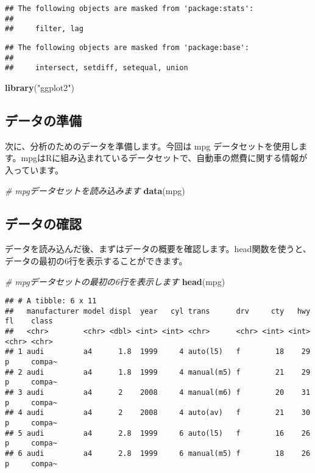 \documentclass[
]{article}
\newenvironment{Shaded}{\begin{snugshade}}{\end{snugshade}}
\newcommand{\CommentTok}[1]{\textcolor[rgb]{0.56,0.35,0.01}{\textit{#1}}}
\newcommand{\FunctionTok}[1]{\textcolor[rgb]{0.13,0.29,0.53}{\textbf{#1}}}
\newcommand{\NormalTok}[1]{#1}
\newcommand{\StringTok}[1]{\textcolor[rgb]{0.31,0.60,0.02}{#1}}
\begin{document}
\begin{verbatim}
## The following objects are masked from 'package:stats':
## 
##     filter, lag
\end{verbatim}

\begin{verbatim}
## The following objects are masked from 'package:base':
## 
##     intersect, setdiff, setequal, union
\end{verbatim}

\begin{Shaded}
\begin{Highlighting}[]
\FunctionTok{library}\NormalTok{(}\StringTok{"ggplot2"}\NormalTok{)}
\end{Highlighting}
\end{Shaded}

\hypertarget{ux30c7ux30fcux30bfux306eux6e96ux5099}{%
\subsection{データの準備}\label{ux30c7ux30fcux30bfux306eux6e96ux5099}}

次に、分析のためのデータを準備します。今回は mpg
データセットを使用します。mpgはRに組み込まれているデータセットで、自動車の燃費に関する情報が入っています。

\begin{Shaded}
\begin{Highlighting}[]
\CommentTok{\# mpgデータセットを読み込みます}
\FunctionTok{data}\NormalTok{(mpg)}
\end{Highlighting}
\end{Shaded}

\hypertarget{ux30c7ux30fcux30bfux306eux78baux8a8d}{%
\subsection{データの確認}\label{ux30c7ux30fcux30bfux306eux78baux8a8d}}

データを読み込んだ後、まずはデータの概要を確認します。head関数を使うと、データの最初の6行を表示することができます。

\begin{Shaded}
\begin{Highlighting}[]
\CommentTok{\# mpgデータセットの最初の6行を表示します}
\FunctionTok{head}\NormalTok{(mpg)}
\end{Highlighting}
\end{Shaded}

\begin{verbatim}
## # A tibble: 6 x 11
##   manufacturer model displ  year   cyl trans      drv     cty   hwy fl    class 
##   <chr>        <chr> <dbl> <int> <int> <chr>      <chr> <int> <int> <chr> <chr> 
## 1 audi         a4      1.8  1999     4 auto(l5)   f        18    29 p     compa~
## 2 audi         a4      1.8  1999     4 manual(m5) f        21    29 p     compa~
## 3 audi         a4      2    2008     4 manual(m6) f        20    31 p     compa~
## 4 audi         a4      2    2008     4 auto(av)   f        21    30 p     compa~
## 5 audi         a4      2.8  1999     6 auto(l5)   f        16    26 p     compa~
## 6 audi         a4      2.8  1999     6 manual(m5) f        18    26 p     compa~
\end{verbatim}
\end{document}
